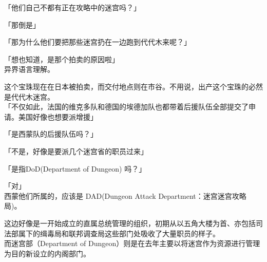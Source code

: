 「他们自己不都有正在攻略中的迷宫吗？」

「那倒是」

「那为什么他们要把那些迷宫扔在一边跑到代代木来呢？」

「想也知道，是那个拍卖的原因啦」\\

异界语言理解。

这个宝珠现在在日本被拍卖，而交付地点则在市谷。不用说，出产这个宝珠的必然是代代木迷宫。\\

「不仅如此，法国的维克多队和德国的埃德加队也都带着后援队伍全部提交了申请。美国好像也想要派增援」

「是西蒙队的后援队伍吗？」

「不是，好像是要派几个迷宫省的职员过来」

「是指DoD(Department of Dungeon) 吗？」

「对」\\

西蒙他们所属的，应该是 DAD(Dungeon Attack Department：迷宫迷宫攻略局)。

这边好像是一开始成立的直属总统管理的组织，初期从以五角大楼为首、亦包括司法部属下的缉毒局和联邦调查局这些部门处吸收了大量职员的样子。\\

而迷宫部（Department of Dungeon）则是在去年主要以将迷宫作为资源进行管理为目的新设立的内阁部门。

